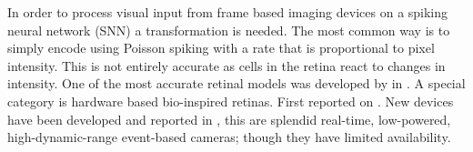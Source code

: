 In order to process visual input from frame based imaging devices on a spiking 
neural network (SNN) a transformation is needed. The most common way is to 
simply encode using Poisson spiking with a rate that is proportional to pixel
intensity. This is not entirely accurate as cells in the retina react to changes
in intensity\cite{webvision}. One of the most accurate retinal models was
developed by \citeauthor{virtual-retina} in \cite{virtual-retina}. A special
category is hardware based bio-inspired retinas. First reported on 
\cite{carver-mead}. New devices have been developed and reported in
\cite{aer-retina-bernabe, dvs-zurich}, this are splendid real-time, low-powered,
high-dynamic-range event-based cameras; though they have limited availability.

